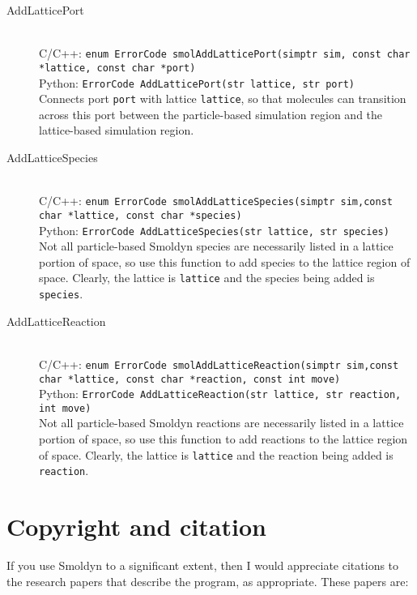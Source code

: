 \documentclass {scrbook}
\newcommand {\ttt} {\texttt}
\begin{document}
\begin{description}
\item[AddLatticePort]
\hfill \\
C/C++: \ttt{enum ErrorCode smolAddLatticePort(simptr sim, const char *lattice, const char *port)}\\
Python: \ttt{ErrorCode AddLatticePort(str lattice, str port)}\\
Connects port \ttt{port} with lattice \ttt{lattice}, so that molecules can transition across this port between the particle-based simulation region and the lattice-based simulation region.

\item[AddLatticeSpecies]
\hfill \\
C/C++: \ttt{enum ErrorCode smolAddLatticeSpecies(simptr sim,const char *lattice, const char *species)}\\
Python: \ttt{ErrorCode AddLatticeSpecies(str lattice, str species)}\\
Not all particle-based Smoldyn species are necessarily listed in a lattice portion of space, so use this function to add species to the lattice region of space. Clearly, the lattice is \ttt{lattice} and the species being added is \ttt{species}.

\item[AddLatticeReaction]
\hfill \\
C/C++: \ttt{enum ErrorCode smolAddLatticeReaction(simptr sim,const char *lattice, const char *reaction, const int move)}\\
Python: \ttt{ErrorCode AddLatticeReaction(str lattice, str reaction, int move)}\\
Not all particle-based Smoldyn reactions are necessarily listed in a lattice portion of space, so use this function to add reactions to the lattice region of space. Clearly, the lattice is \ttt{lattice} and the reaction being added is \ttt{reaction}.

\end{description}


\chapter{Copyright and citation}

If you use Smoldyn to a significant extent, then I would appreciate citations to the research papers that describe the program, as appropriate. These papers are:
\end{document}

